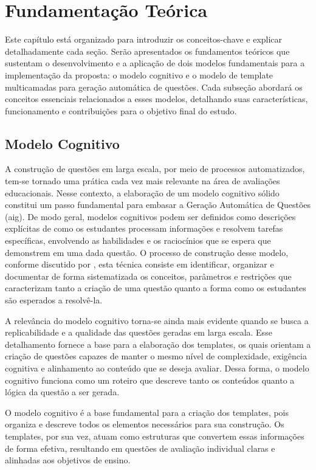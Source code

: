 \chapter{Fundamentação Teórica}\label{cap:fundamentacao-teorica}

Este capítulo está organizado para introduzir os conceitos-chave e explicar detalhadamente cada seção. Serão apresentados os fundamentos teóricos que sustentam o desenvolvimento e a aplicação de dois modelos fundamentais para a implementação da proposta: o modelo cognitivo e o modelo de template multicamadas para geração automática de questões. Cada subseção abordará os conceitos essenciais relacionados a esses modelos, detalhando suas características, funcionamento e contribuições para o objetivo final do estudo.

\section{Modelo Cognitivo}
A construção de questões em larga escala, por meio de processos automatizados, tem-se tornado uma prática cada vez mais relevante na área de avaliações educacionais. Nesse contexto, a elaboração de um modelo cognitivo sólido constitui um passo fundamental para embasar a Geração Automática de Questões (\gls{aig}). De modo geral, modelos cognitivos podem ser definidos como descrições explícitas de como os estudantes processam informações e resolvem tarefas específicas, envolvendo as habilidades e os raciocínios que se espera que demonstrem em uma dada questão. O processo de construção desse modelo, conforme discutido por \parencite{gierl2021}, esta técnica consiste em identificar, organizar e documentar de forma sistematizada os conceitos, parâmetros e restrições que caracterizam tanto a criação de uma questão quanto a forma como os estudantes são esperados a resolvê-la.

A relevância do modelo cognitivo torna-se ainda mais evidente quando se busca a replicabilidade e a qualidade das questões geradas em larga escala. Esse detalhamento fornece a base para a elaboração dos templates, os quais orientam a criação de questões capazes de manter o mesmo nível de complexidade, exigência cognitiva e alinhamento ao conteúdo que se deseja avaliar. Dessa forma, o modelo cognitivo funciona como um roteiro que descreve tanto os conteúdos quanto a lógica da questão a ser gerada.

O modelo cognitivo é a base fundamental para a criação dos templates, pois organiza e descreve todos os elementos necessários para sua construção. Os templates, por sua vez, atuam como estruturas que convertem essas informações de forma efetiva, resultando em questões de avaliação individual claras e alinhadas aos objetivos de ensino.


